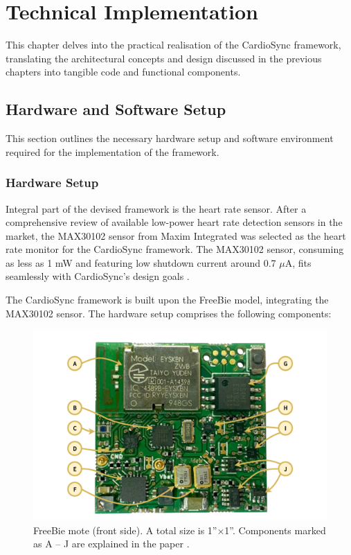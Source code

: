 \chapter{Technical Implementation}
\label{chap:implementation}
This chapter delves into the practical realisation of the CardioSync framework, translating the architectural concepts and design discussed in the previous chapters into tangible code and functional components. 

\section{Hardware and Software Setup}
This section outlines the necessary hardware setup and software environment required for the implementation of the framework.

\subsection{Hardware Setup}

\noindent Integral part of the devised framework is the heart rate sensor. After a comprehensive review of available low-power heart rate detection sensors in the market, the MAX30102 sensor from Maxim Integrated \cite{2018MAX30102} was selected as the heart rate monitor for the CardioSync framework. The MAX30102 sensor, consuming as less as 1 mW and featuring low shutdown current around 0.7 \(\mu\)A, fits seamlessly with CardioSync's design goals \cite{2018MAX30102}.
\vspace{1\baselineskip}

\noindent The CardioSync framework is built upon the FreeBie model, integrating the MAX30102 sensor. The hardware setup comprises the following components:

\begin{figure}[t]
    \centering
    \includegraphics[width=0.6\linewidth]{chapters/Implementation/Freebie.png}
    \caption{FreeBie mote (front side). A total size is 1”×1”. Components marked as A – J are explained in the paper \cite{de2022Intermittently}.}
    \label{fig:freebie}
\end{figure}

